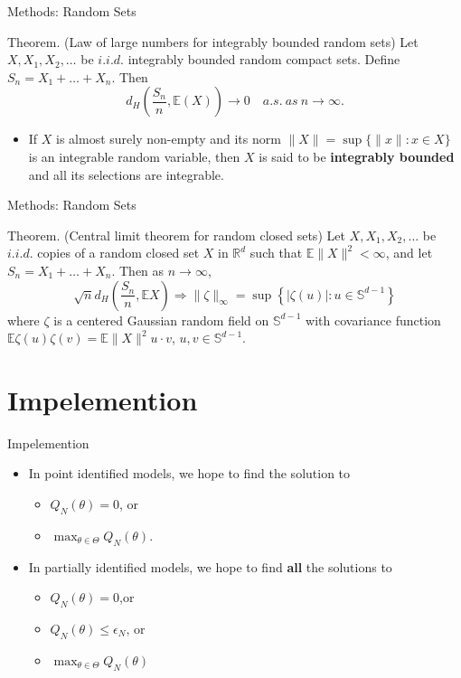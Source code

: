 \documentclass[aspectratio=169]{beamer}  %
\begin{document}
\begin{frame}{Methods: Random Sets}
    \begin{block}{Theorem. (Law of large numbers for integrably bounded random sets)} 
        Let $X, X_1, X_2,\ldots$ be $i.i.d.$ integrably bounded random compact sets. Define $S_n = X_1 + \ldots + X_n$. Then
        $$d_H\left(\frac{{S}_n}{n},\mathbb{E}(X)\right)\to0\quad a.s.\mathrm{~}as\mathrm{~}n\to\infty.$$
    \end{block}
    \begin{itemize}
        \item If $X$ is almost surely non-empty and its norm $\|X\|=\sup\{\|x\|:x\in X\}$ is an integrable random variable, then $X$ is said to be \textbf{integrably bounded} and all its selections are integrable.
    \end{itemize}
\end{frame}

\begin{frame}{Methods: Random Sets}
    \begin{block}{Theorem. (Central limit theorem for random closed sets)} 
        Let $X, X_1, X_2,\ldots$ be $i.i.d.$ copies of a random closed set $X$ in $\mathbb{R}^d$ such that $\mathbb{E}\|X\|^2<\infty$, and let $S_n = X_1 + \ldots + X_n$. Then as $n\to\infty$,
        $$\sqrt{n}d_H\left(\frac{S_n}{n},\mathbb{E}X\right)\Rightarrow\|\zeta\|_\infty=\sup\left\{|\zeta(u)|:u\in\mathbb{S}^{d-1}\right\}$$
        where $\zeta$ is a centered Gaussian random field on $\mathbb{S}^{d-1}$ with covariance function $\mathbb{E}\zeta(u)\zeta(v)=\mathbb{E}\|X\|^2u\cdot v$, $u,v\in\mathbb{S}^{d-1}$.
    \end{block}
\end{frame}

\section{Impelemention}
\begin{frame}{Impelemention}
    \begin{itemize}
        \item In point identified models, we hope to find the solution to
        \begin{itemize}
            \item $Q_N(\theta)=0$, or
            \item $\max_{\theta\in\Theta}Q_N(\theta)$.
        \end{itemize}   
        \item In partially identified models, we hope to find \textbf{all} the solutions to
        \begin{itemize}
            \item $Q_N(\theta)=0$,or
            \item $Q_N(\theta)\leq\epsilon_N$, or
            \item $\max_{\theta\in\Theta}Q_N(\theta)$
        \end{itemize} 
    \end{itemize}
\end{frame}
\end{document}
